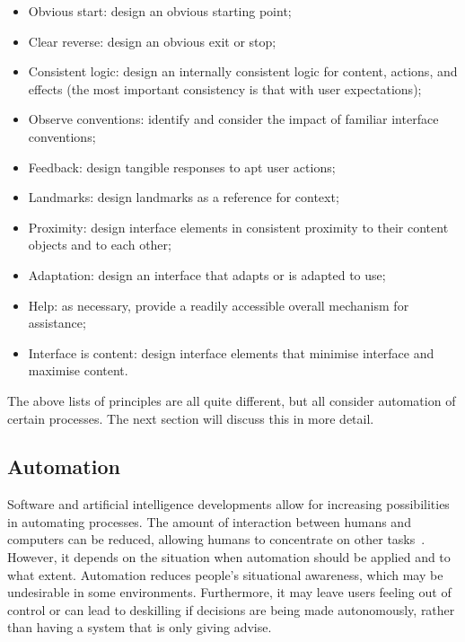 \begin{itemize}[noitemsep,topsep=0pt,parsep=0pt,partopsep=0pt]
\item Obvious start: design an obvious starting point;
\item Clear reverse: design an obvious exit or stop;
\item Consistent logic: design an internally consistent logic for content, actions, and effects (the most important consistency is that with user expectations);
\item Observe conventions: identify and consider the impact of familiar interface conventions;
\item Feedback: design tangible responses to apt user actions;
\item Landmarks: design landmarks as a reference for context;
\item Proximity: design interface elements in consistent proximity to their content objects and to each other;
\item Adaptation: design an interface that adapts or is adapted to use;
\item Help: as necessary, provide a readily accessible overall mechanism for assistance;
\item Interface is content: design interface elements that minimise interface and maximise content.
\end{itemize}

The above lists of principles are all quite different, but all consider automation of certain processes. The next section will discuss this in more detail.

\subsection{Automation}
Software and artificial intelligence developments allow for increasing possibilities in automating processes. The amount of interaction between humans and computers can be reduced, allowing humans to concentrate on other tasks~\cite{payne2000varying}. However, it depends on the situation when automation should be applied and to what extent. Automation reduces people's situational awareness, which may be undesirable in some environments. Furthermore, it may leave users feeling out of control or can lead to deskilling if decisions are being made autonomously, rather than having a system that is only giving advise.

